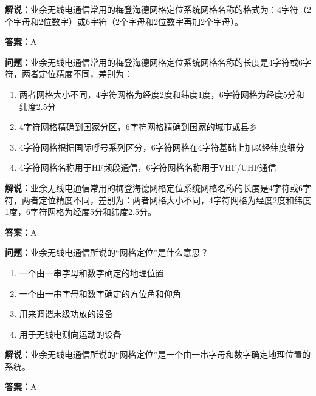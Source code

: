 \textbf{解说：}业余无线电通信常用的梅登海德网格定位系统网格名称的格式为：4字符（2个字母和2位数字）或6字符（2个字母和2位数字再加2个字母）。

\textbf{答案：}A

\textbf{问题：}业余无线电通信常用的梅登海德网格定位系统网格名称的长度是4字符或6字符，两者定位精度不同，差别为：

\begin{enumerate}[label=\Alph*), leftmargin=1cm]
	\item 两者网格大小不同，4字符网格为经度2度和纬度1度，6字符网格为经度5分和纬度2.5分
	\item 4字符网格精确到国家分区，6字符网格精确到国家的城市或县乡
	\item 4字符网格根据国际呼号系列区分，6字符网格在4字符基础上加以经纬度细分
	\item 4字符网格名称用于HF频段通信，6字符网格名称用于VHF/UHF通信
\end{enumerate}

\textbf{解说：}业余无线电通信常用的梅登海德网格定位系统网格名称的长度是4字符或6字符，两者定位精度不同，差别为：两者网格大小不同，4字符网格为经度2度和纬度1度，6字符网格为经度5分和纬度2.5分。

\textbf{答案：}A

\textbf{问题：}业余无线电通信所说的“网格定位”是什么意思？

\begin{enumerate}[label=\Alph*), leftmargin=1cm]
	\item 一个由一串字母和数字确定的地理位置
	\item 一个由一串字母和数字确定的方位角和仰角
	\item 用来调谐末级功放的设备
	\item 用于无线电测向运动的设备
\end{enumerate}

\textbf{解说：}业余无线电通信所说的“网格定位”是一个由一串字母和数字确定地理位置的系统。

\textbf{答案：}A